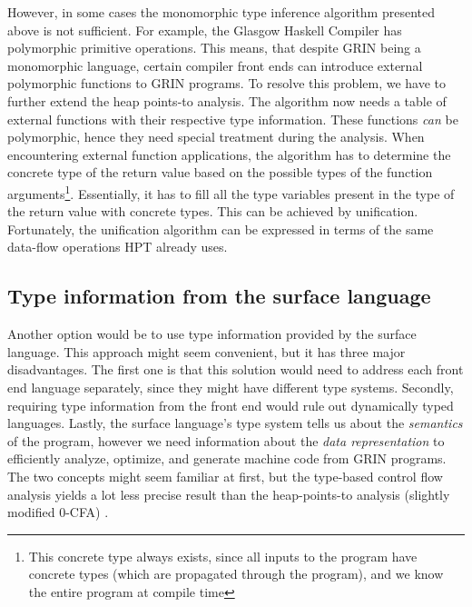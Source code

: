 \documentclass[main.tex]{subfiles}
\begin{document}
	However, in some cases the monomorphic type inference algorithm presented above is not sufficient. For example, the Glasgow Haskell Compiler has polymorphic primitive operations. This means, that despite GRIN being a monomorphic language, certain compiler front ends can introduce external polymorphic functions to GRIN programs. To resolve this problem, we have to further extend the heap points-to analysis. The algorithm now needs a table of external functions with their respective type information. These functions \emph{can} be polymorphic, hence they need special treatment during the analysis. When encountering external function applications, the algorithm has to determine the concrete type of the return value based on the possible types of the function arguments\footnote{This concrete type always exists, since all inputs to the program have concrete types (which are propagated through the program), and we know the entire program at compile time}. Essentially, it has to fill all the type variables present in the type of the return value with concrete types. This can be achieved by unification. Fortunately, the unification algorithm can be expressed in terms of the same data-flow operations HPT already uses.
	
	\subsection{Type information from the surface language}
	
	Another option would be to use type information provided by the surface language. This approach might seem convenient, but it has three major disadvantages. The first one is that this solution would need to address each front end language separately, since they might have different type systems. Secondly, requiring type information from the front end would rule out dynamically typed languages. Lastly, the surface language's type system tells us about the \textit{semantics} of the program, however we need information about the \textit{data representation} to efficiently analyze, optimize, and generate machine code from GRIN programs. The two concepts might seem familiar at first, but the type-based control flow analysis yields a lot less precise result than the heap-points-to analysis (slightly modified 0-CFA) \cite{mlton-cfa}. 
	
\end{document}
